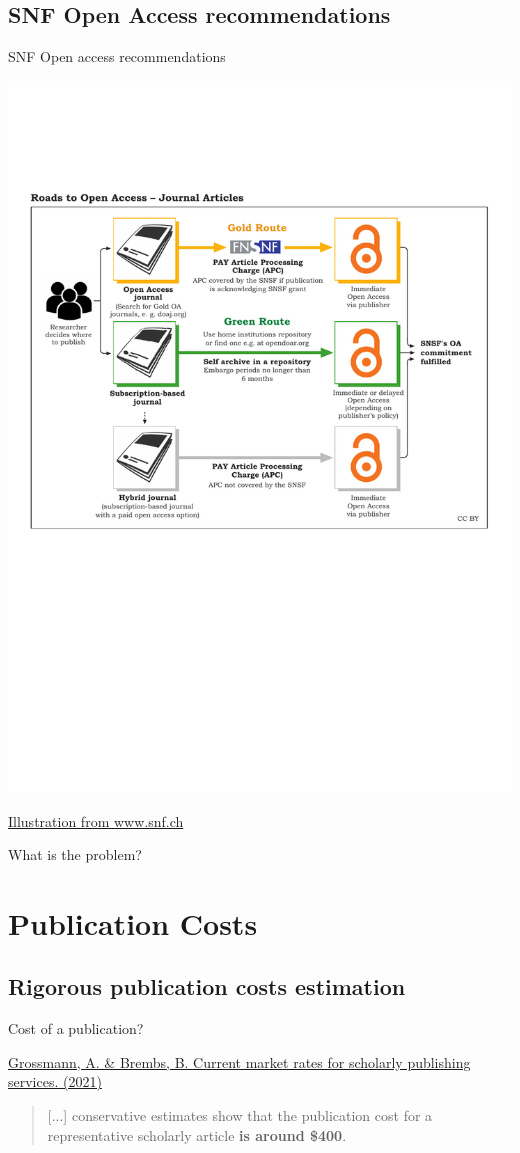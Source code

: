 \documentclass[10pt,compress,serif,aspectratio=169]{beamer}
\begin{document}
\subsection{SNF Open Access recommendations}
\begin{frame}[t]{SNF Open access recommendations}

  \begin{center}
    \includegraphics[width=.65\textwidth]{SNSF_Roads_to_OA_Articles}
  \end{center}
  \href{https://www.snf.ch/en/VyUvGzptStOEpUoC/topic/open-access-to-publications}{Illustration from www.snf.ch}
\end{frame}


\begin{frame}[t]{What is the problem?}
\end{frame}


\section{Publication Costs}
\subsection{Rigorous publication costs estimation}
\begin{frame}[t]{Cost of a publication?}

\href{https://doi.org/10.12688/f1000research.27468.2}{Grossmann, A. \& Brembs, B. Current market rates for scholarly publishing services. (2021)} 
\begin{quote}
  \vspace{.5cm}
   [...] conservative estimates show that the publication cost for a representative scholarly article \textbf{is around \$400}.
 \end{quote}

 \pause
 \vfill
{}
\end{frame}
\end{document}
